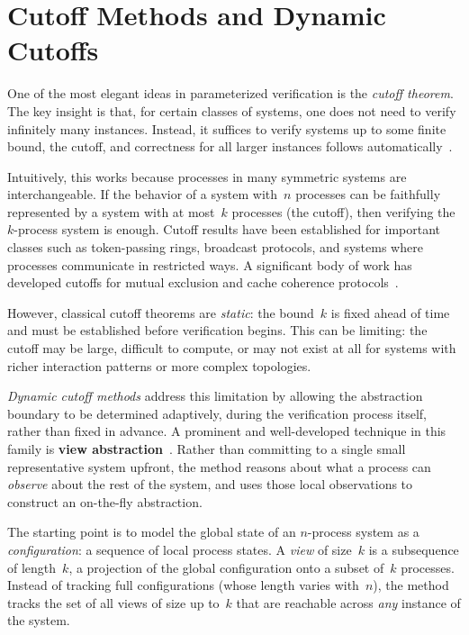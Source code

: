 \section{Cutoff Methods and Dynamic Cutoffs}

One of the most elegant ideas in parameterized verification is the
\emph{cutoff theorem}. The key insight is that, for certain classes of
systems, one does not need to verify infinitely many instances. Instead, it
suffices to verify systems up to some finite bound, the cutoff, and
correctness for all larger instances follows automatically~\cite{EN95,EK03}.

Intuitively, this works because processes in many symmetric systems are
interchangeable. If the behavior of a system with~$n$ processes can be
faithfully represented by a system with at most~$k$ processes (the cutoff),
then verifying the $k$-process system is enough. Cutoff results have been
established for important classes such as token-passing rings, broadcast
protocols, and systems where processes communicate in restricted ways. A
significant body of work has developed cutoffs for mutual exclusion and cache
coherence protocols~\cite{EK03}.

However, classical cutoff theorems are \emph{static}: the bound~$k$ is fixed
ahead of time and must be established before verification begins. This can be
limiting: the cutoff may be large, difficult to compute, or may not exist
at all for systems with richer interaction patterns or more complex topologies.

\emph{Dynamic cutoff methods} address this limitation by allowing the
abstraction boundary to be determined adaptively, during the verification
process itself, rather than fixed in advance. A prominent and well-developed
technique in this family is \textbf{view abstraction}~\cite{AHH13,AHH16}.
Rather than committing to a single small representative system upfront, the
method reasons about what a process can \emph{observe} about the rest of the
system, and uses those local observations to construct an on-the-fly
abstraction.

The starting point is to model the global state of an $n$-process system as a
\emph{configuration}: a sequence of local process states. A \emph{view} of
size~$k$ is a subsequence of length~$k$, a projection of the global
configuration onto a subset of~$k$ processes. Instead of tracking full
configurations (whose length varies with~$n$), the method tracks the set of
all views of size up to~$k$ that are reachable across \emph{any} instance of
the system.

